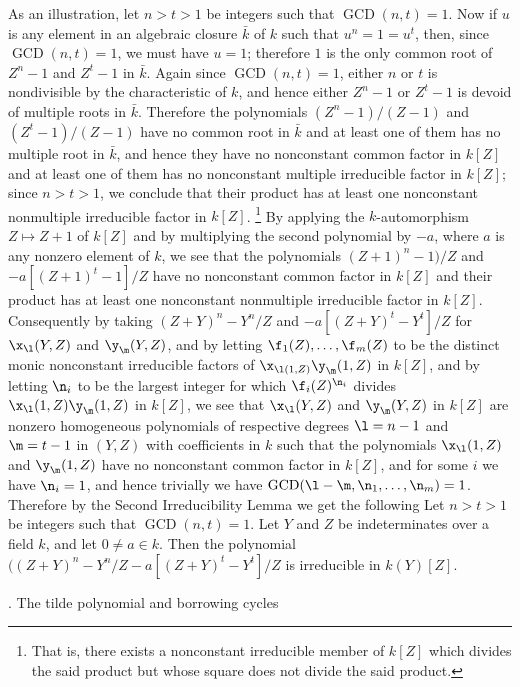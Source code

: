 As an illustration, let $n>t>1$ be integers such that 
$\operatorname{GCD}(n,t)=1$.
Now if $u$ is any element in an algebraic closure $\bar k$ 
of $k$ such that 
$u^n=1=u^t$, then, since $\operatorname{GCD}(n,t)=1$, we 
must have $u=1$; 
therefore $1$ is the only common root of $Z^n-1$ and 
$Z^t-1$ in $\bar k$. 
Again since $\operatorname{GCD}(n,t)=1$, either $n$ or $t$ 
is nondivisible by the 
characteristic of $k$, and hence either $Z^n-1$ or $Z^t-1$ 
is  devoid of 
multiple roots in $\bar k$. Therefore the polynomials
$(Z^n-1)/(Z-1)$ and $(Z^t-1)/(Z-1)$ have no common root in 
$\bar k$
and at least one of them has no multiple root in $\bar k$,
and hence they have no nonconstant common factor in $k[Z]$ 
and at least one
of them has no nonconstant multiple irreducible factor in 
$k[Z]$; 
since $n>t>1$, we conclude that their product has at least 
one nonconstant 
nonmultiple irreducible factor in $k[Z]$.
\footnote{That is, there exists a nonconstant irreducible 
member of $k[Z]$
which divides the said product but whose square does not 
divide the said 
product.}
By applying the $k$-automorphism $Z\mapsto Z+1$ of $k[Z]$ 
and by multiplying
the second polynomial by $-a$, where $a$ is any nonzero 
element of $k$, we see
that the polynomials $(Z+1)^n-1)/Z$ and $-a[(Z+1)^t-1]/Z$
have no nonconstant common factor in $k[Z]$ and their 
product has at 
least one nonconstant nonmultiple irreducible factor in 
$k[Z]$.
Consequently by taking $(Z+Y)^n-Y^n/Z$ and
$-a[(Z+Y)^t-Y^t]/Z$ for $\x_{\l}(Y,Z)$ and $\y_{\m}(Y,Z)$, 
and by letting $\f_1(Z),\dots,\f_m(Z)$ to be the distinct 
monic nonconstant 
irreducible factors of $\x_{\l(1,Z)}\y_{\m}(1,Z)$ in 
$k[Z]$, and by letting
$\n_i$ to be the largest integer for which 
$\f_i(Z)^{\n_i}$ divides
$\x_{\l}(1,Z)\y_{\m}(1,Z)$ in $k[Z]$, we see that 
$\x_{\l}(Y,Z)$ and $\y_{\m}(Y,Z)$ in $k[Z]$ are nonzero 
homogeneous polynomials
of respective degrees $\l=n-1$ and $\m=t-1$ in $(Y,Z)$ 
with coefficients in
$k$ such that the polynomials
$\x_{\l}(1,Z)$ and $\y_{\m}(1,Z)$ have no nonconstant 
common factor in $k[Z]$, 
and for some $i$ we have $\n_i=1$, and hence 
trivially we have 
$\operatorname{GCD}(\l-\m,\n_1,\dots,\n_m)=1$. Therefore 
by the
Second Irreducibility Lemma we get the following
Let $n>t>1$ be integers such that 
$\operatorname{GCD}(n,t)=1$. Let $Y$ and $Z$ be 
indeterminates over a field $k$, and let $0\ne a\in k$. 
Then the polynomial
$((Z+Y)^n-Y^n/Z-a[(Z+Y)^t-Y^t]/Z$ is irreducible in
$k(Y)[Z]$.
\endproclaim

. The tilde polynomial and borrowing 
cycles\endheading

